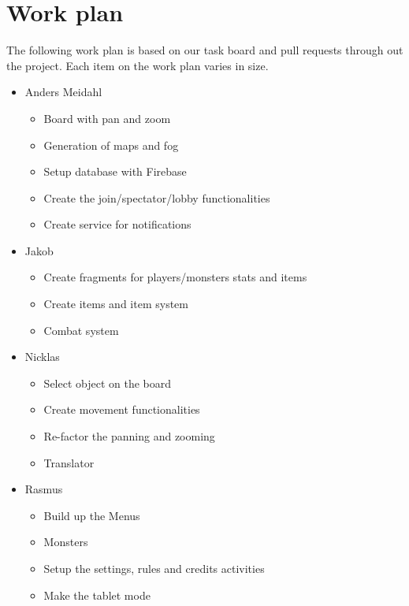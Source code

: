 \pagestyle{Uni}

\chapter{Work plan}
The following work plan is based on our task board and pull requests through out the project. Each item on the work plan varies in size.

\begin{itemize}
	\item Anders Meidahl
	\begin{itemize}
		\item Board with pan and zoom 
		\item Generation of maps and fog
		\item Setup database with Firebase
		\item Create the join/spectator/lobby functionalities
		\item Create service for notifications
	\end{itemize}
	
	\item Jakob
	\begin{itemize}
		\item Create fragments for players/monsters stats and items
		\item Create items and item system
		\item Combat system
	\end{itemize}
	\item Nicklas
	\begin{itemize}
		\item Select object on the board
		\item Create movement functionalities
		\item Re-factor the panning and zooming
		\item Translator
	\end{itemize}
	\item Rasmus
	\begin{itemize}
		\item Build up the Menus
		\item Monsters
		\item Setup the settings, rules and credits activities
		\item Make the tablet mode
	\end{itemize}
\end{itemize}